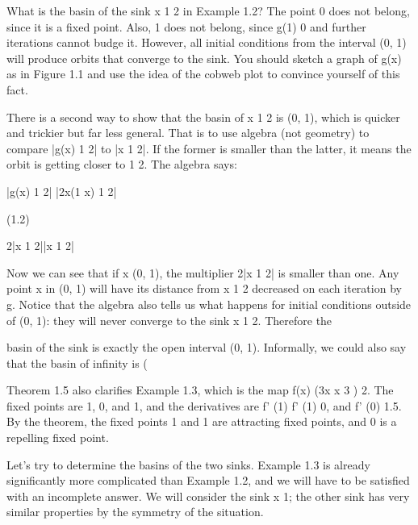 \documentclass[12pt]{article}
\begin{document}
What is the basin of the sink x  1  2 in Example 1.2? The point 0 does not belong, since it is a fixed 
point. Also, 1 does not belong, since g(1)  0 and further iterations cannot budge it. However, all initial 
conditions from the interval (0, 1) will produce orbits that converge to the sink. You should sketch a 
graph of g(x) as in Figure 1.1 and use the idea of the cobweb plot to convince yourself of this fact.

There is a second way to show that the basin of x  1  2 is (0, 1), which is quicker and trickier but far 
less general. That is to use algebra (not geometry) to compare |g(x)  1  2| to |x  1  2|. If the former is 
smaller than the latter, it means the orbit is getting closer to 1  2. The algebra says:

|g(x)  1  2|  |2x(1  x)  1  2|

(1.2)

 2|x  1  2||x  1  2|

Now we can see that if x  (0, 1), the multiplier 2|x  1  2| is smaller than one. Any point x in (0, 1) will 
have its distance from x  1  2 decreased on each iteration by g. Notice that the algebra also tells us what 
happens for initial conditions outside of (0, 1): they will never converge to the sink x  1  2. Therefore 
the


basin of the sink is exactly the open interval (0, 1). Informally, we could also say that the basin of 
infinity is (


Theorem 1.5 also clarifies Example 1.3, which is the map f(x)  (3x  x 3 )  2. The fixed points are 1, 0, 
and 1, and the derivatives are f' (1)  f' (1)  0, and f' (0)  1.5. By the theorem, the fixed points 1 and 1 
are attracting fixed points, and 0 is a repelling fixed point.

Let’s try to determine the basins of the two sinks. Example 1.3 is already significantly more complicated 
than Example 1.2, and we will have to be satisfied with an incomplete answer. We will consider the sink x  
1; the other sink has very similar properties by the symmetry of the situation.
\end{document}
